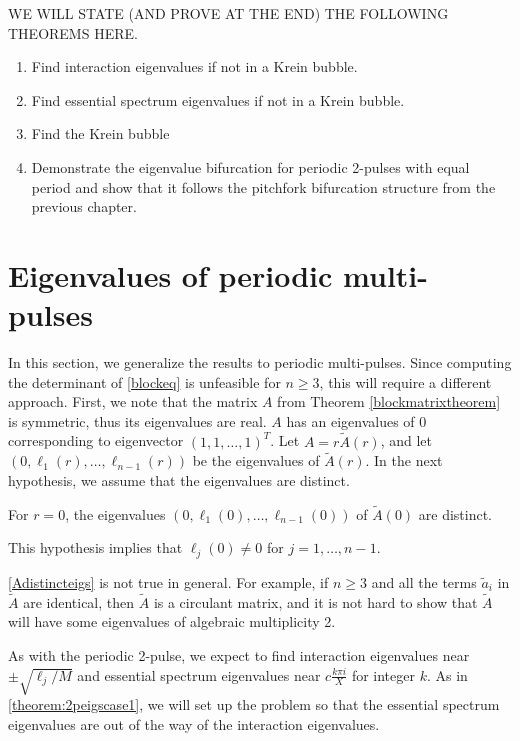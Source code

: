 \documentclass[thesis.tex]{subfiles}
\begin{document}
WE WILL STATE (AND PROVE AT THE END) THE FOLLOWING THEOREMS HERE.
\begin{enumerate}
\item Find interaction eigenvalues if not in a Krein bubble.
\item Find essential spectrum eigenvalues if not in a Krein bubble.
\item Find the Krein bubble
\item Demonstrate the eigenvalue bifurcation for periodic 2-pulses with equal period and show that it follows the pitchfork bifurcation structure from the previous chapter.
\end{enumerate}

\section{Eigenvalues of periodic multi-pulses}

In this section, we generalize the results to periodic multi-pulses. Since computing the determinant of \cref{blockeq} is unfeasible for $n \geq 3$, this will require a different approach. First, we note that the matrix $A$ from Theorem \ref{blockmatrixtheorem} is symmetric, thus its eigenvalues are real. $A$ has an eigenvalues of 0 corresponding to eigenvector $(1, 1, \dots, 1)^T$. Let $A = r \tilde{A}(r)$, and let $(0, \ell_1(r), \dots, \ell_{n-1}(r))$ be the eigenvalues of $\tilde{A}(r)$. In the next hypothesis, we assume that the eigenvalues are distinct.

\begin{hypothesis}\label{Adistincteigs}
For $r = 0$, the eigenvalues $(0, \ell_1(0), \dots, \ell_{n-1}(0))$ of $\tilde{A}(0)$ are distinct.
\end{hypothesis}
This hypothesis implies that $\ell_j(0) \neq 0$ for $j = 1, \dots, n-1$.

\begin{remark}
\cref{Adistincteigs} is not true in general. For example, if $n \geq 3$ and all the terms $\tilde{a}_i$ in $\tilde{A}$ are identical, then $\tilde{A}$ is a circulant matrix, and it is not hard to show that $\tilde{A}$ will have some eigenvalues of algebraic multiplicity 2.
\end{remark}

As with the periodic 2-pulse, we expect to find interaction eigenvalues near $\pm \sqrt{\ell_j/M}$
and essential spectrum eigenvalues near $c \frac{k \pi i }{X}$ for integer $k$. As in \cref{theorem:2peigscase1}, we will set up the problem so that the essential spectrum eigenvalues are out of the way of the interaction eigenvalues.
\end{document}
